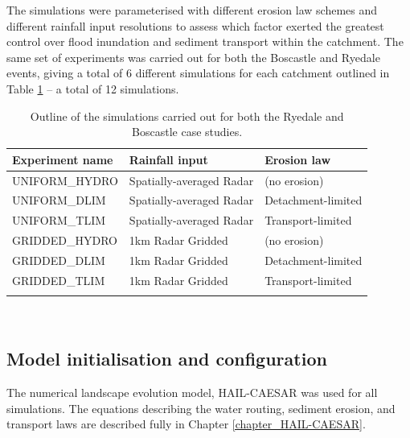The simulations were parameterised with different erosion law schemes and different rainfall input resolutions to assess which factor exerted the greatest control over flood inundation and sediment transport within the catchment. The same set of experiments was carried out for both the Boscastle and Ryedale events, giving a total of 6 different simulations for each catchment outlined in Table \ref{table_ensemble_experiments} -- a total of 12 simulations.

\begin{table}
\begin{tabular}{lll}
\\
\textbf{Experiment name}   & \textbf{Rainfall input} & \textbf{Erosion law}  \\
\hline
UNIFORM\_HYDRO  &  Spatially-averaged  Radar  & (no erosion) \\
UNIFORM\_DLIM      &  Spatially-averaged  Radar & Detachment-limited \\
UNIFORM\_TLIM       &  Spatially-averaged  Radar & Transport-limited \\

GRIDDED\_HYDRO  &  1km Radar Gridded  & (no erosion) \\
GRIDDED\_DLIM      &  1km Radar Gridded  & Detachment-limited \\
GRIDDED\_TLIM       &  1km Radar Gridded   & Transport-limited \\
\hline \\ 
\end{tabular} 
\caption{Outline of the simulations carried out for both the Ryedale and Boscastle case studies.}
\label{table_ensemble_experiments}
\end{table}

\

\subsection{Model initialisation and configuration}
The numerical landscape evolution model, HAIL-CAESAR was used for all simulations.  The equations describing the water routing, sediment erosion, and transport laws are described fully in Chapter \ref{chapter_HAIL-CAESAR}.
%

